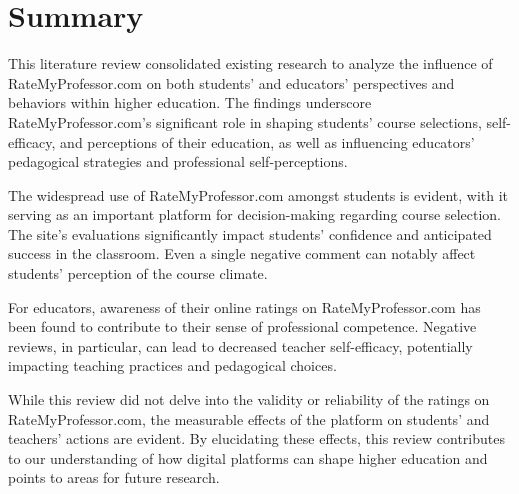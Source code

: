 \documentclass[man, 12pt]{apa7}
\begin{document}
\section{Summary}
This literature review consolidated existing research to analyze the influence of RateMyProfessor.com on both students' and educators' perspectives and behaviors within higher education. The findings underscore RateMyProfessor.com's significant role in shaping students' course selections, self-efficacy, and perceptions of their education, as well as influencing educators' pedagogical strategies and professional self-perceptions.

The widespread use of RateMyProfessor.com amongst students is evident, with it serving as an important platform for decision-making regarding course selection. The site's evaluations significantly impact students' confidence and anticipated success in the classroom. Even a single negative comment can notably affect students' perception of the course climate.

For educators, awareness of their online ratings on RateMyProfessor.com has been found to contribute to their sense of professional competence. Negative reviews, in particular, can lead to decreased teacher self-efficacy, potentially impacting teaching practices and pedagogical choices.

While this review did not delve into the validity or reliability of the ratings on RateMyProfessor.com, the measurable effects of the platform on students' and teachers' actions are evident. By elucidating these effects, this review contributes to our understanding of how digital platforms can shape higher education and points to areas for future research.







\printbibliography
\end{document}
